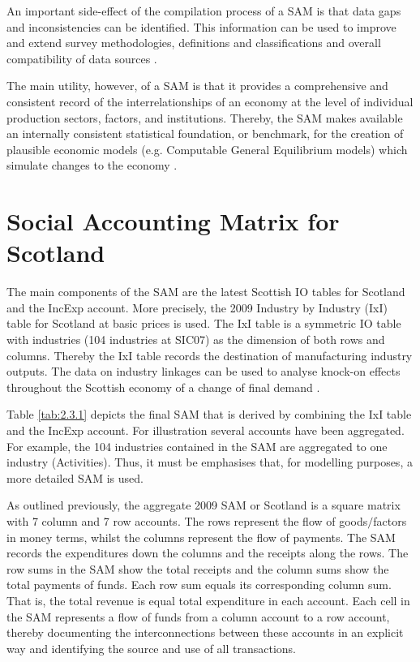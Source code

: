 An important side-effect of the compilation process of a SAM is that data gaps and inconsistencies can be identified. This information can be used to improve and extend survey methodologies, definitions and classifications and overall compatibility of data sources \cite{Keuning1988a}. 

\bigskip

The main utility, however, of a SAM is that it provides a comprehensive and consistent record of the interrelationships of an economy at the level of individual production sectors, factors, and institutions. Thereby, the SAM makes available an internally consistent statistical foundation, or benchmark, for the creation of plausible economic models (e.g. Computable General Equilibrium models) which simulate changes to the economy \cite{Reinert1997a}.     

\newpage
\section{Social Accounting Matrix for Scotland} 
\label{sec:2.3}

The main components of the SAM are the latest Scottish IO tables for Scotland \cite{ScottishGovernment2013a} and the IncExp account. More precisely, the 2009 Industry by Industry (IxI) table for Scotland at basic prices is used. The IxI table is a symmetric IO table with industries (104 industries at SIC07) as the dimension of both rows and columns. Thereby the IxI table records the destination of manufacturing industry outputs. The data on industry linkages can be used to analyse knock-on effects throughout the Scottish economy of a change of final demand \cite{ScottishGovernment2011a}. 

\bigskip

Table \ref{tab:2.3.1} depicts the final SAM that is derived by combining the IxI table and the IncExp account. For illustration several accounts have been aggregated. For example, the 104 industries contained in the SAM are aggregated to one industry (Activities). Thus, it must be emphasises that, for modelling purposes, a more detailed SAM is used.   

\bigskip

As outlined previously, the aggregate 2009 SAM or Scotland is a square matrix with 7 column and 7 row accounts. The rows represent the flow of goods$/$factors in money terms, whilst the columns represent the flow of payments. The SAM records the expenditures down the columns and the receipts along the rows. The row sums in the SAM show the total receipts and the column sums show the total payments of funds. Each row sum equals its corresponding column sum. That is, the total revenue is equal total expenditure in each account. Each cell in the SAM represents a flow of funds from a column account to a row account, thereby documenting the interconnections between these accounts in an explicit way and identifying the source and use of all transactions. 

